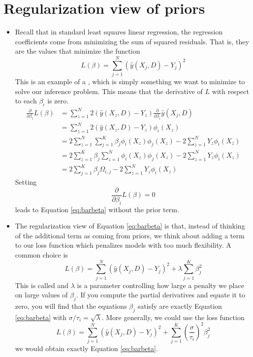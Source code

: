 \section{Regularization view of priors}
\begin{itemize}
\item Recall that in standard least squares linear regression, the regression coefficients come from minimizing the sum of squared residuals. That is, they are the values that minimize the function 
\begin{equation*}
L(\beta) = \sum_{j=1}^N(\hat{y}(X_j,D)- Y_j)^2
\end{equation*}
This is an example of a , which is simply something we want to minimize to solve our inference problem. 
This means that the derivative of $L$ with respect to each $\beta_i$ is zero. 
\begin{align*}
\frac{\partial}{\partial \beta_i}L(\beta) &=  \sum_{z=1}^N2(\hat{y}(X_z,D)- Y_z)\frac{\partial}{\partial \beta_i}\hat{y}(X_j,D)\\
&=  \sum_{z=1}^N2(\hat{y}(X_z,D)- Y_z)\phi_i(X_z)\\
&= 2\sum_{z=1}^N\sum_{j=1}^{K} \beta_j\phi_i(X_z)\phi_j(X_z)- 2\sum_{z=1}^NY_z\phi_i(X_z)\\
&= 2\sum_{z=1}^{K} \beta_j\sum_{z=1}^N \phi_i(X_z)\phi_j(X_z)- 2\sum_{z=1}^NY_z\phi_i(X_z)\\
&=2\sum_{j=1}^{K}\beta_j \Omega_{i,j} - 2\sum_{z=1}^NY_z\phi_i(X_z)
\end{align*}
Setting 
\begin{equation*}
\frac{\partial}{\partial \beta_i}L(\beta) =0 
\end{equation*}
leads to Equation \ref{eq:barbeta} without the prior term. 
\item The regularization view of Equation \ref{eq:barbeta} is that, instead of thinking of the additional term as coming from priors, we think about adding a term to our loss function which penalizes models with too much flexibility. A common choice is   
\begin{equation*}
L(\beta) = \sum_{j=1}^N(\hat{y}(X_j,D)- Y_j)^2 + \lambda \sum_{j=1}^K \beta_j^2
\end{equation*}
This is called  and $\lambda$ is a parameter controlling how large a penalty we place on large values of $\beta_j$. 
If you compute the partial derivatives and equate it to zero, you will find that the equations $\beta_j$ satisfy are exactly Equation \ref{eq:barbeta} with $\sigma/\tau_i = \sqrt{\lambda}$. More generally, we could use the loss function 
\begin{equation*}
L(\beta) = \sum_{j=1}^N(\hat{y}(X_j,D)- Y_j)^2 +  \sum_{j=1}^K\left( \frac{\sigma}{\tau_i}\right)^2\beta_j^2
\end{equation*}
we would obtain exactly Equation \ref{eq:barbeta}.
\end{itemize}

